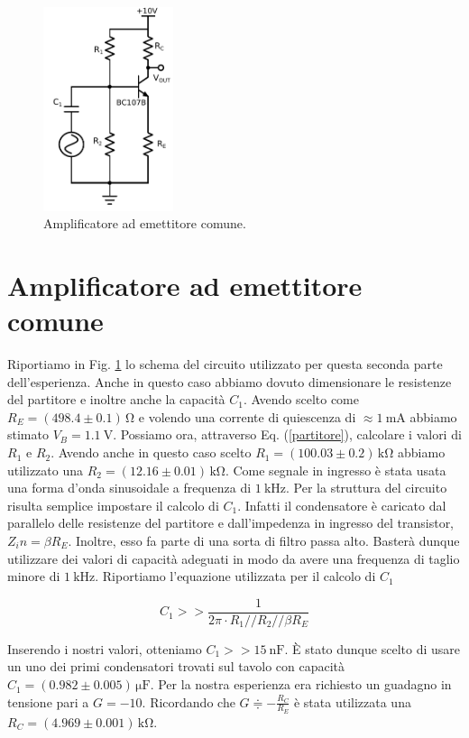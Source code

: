 \begin{figure}
	\includegraphics[width=38mm]{cc2.pdf}
	\caption{Amplificatore ad emettitore comune.}
	\label{fig:cc2}
\end{figure}

\section{Amplificatore ad emettitore comune}

Riportiamo in Fig. \ref{fig:cc2} lo schema del circuito utilizzato per questa seconda parte dell'esperienza.
Anche in questo caso abbiamo dovuto dimensionare le resistenze del partitore e inoltre anche la capacità $C_1$.
Avendo scelto come $R_E=(498.4\pm0.1)\,\si{\ohm}$ e volendo una corrente di quiescenza di $\approx \SI{1}{\milli\ampere}$ abbiamo stimato $V_B=\SI{1.1}{\volt}$.
Possiamo ora, attraverso Eq. (\ref{partitore}), calcolare i valori di $R_1$ e $R_2$.
Avendo anche in questo caso scelto $R_1=(100.03\pm0.2)\,\si{\kilo\ohm}$ abbiamo utilizzato una $R_2=(12.16\pm0.01)\,\si{\kilo\ohm}$.
Come segnale in ingresso è stata usata una forma d'onda sinusoidale a frequenza di $\SI{1}{\kilo\hertz}$.
Per la struttura del circuito risulta semplice impostare il calcolo di $C_1$.
Infatti il condensatore è caricato dal parallelo delle resistenze del partitore e dall'impedenza in ingresso del transistor, $Z_in=\beta R_E$.
Inoltre, esso fa parte di una sorta di filtro passa alto.
Basterà dunque utilizzare dei valori di capacità adeguati in modo da avere una frequenza di taglio minore di $\SI{1}{\kilo\hertz}$.
Riportiamo l'equazione utilizzata per il calcolo di $C_1$

\begin{equation}
C_1>>\frac{1}{2 \pi \cdot R_1 // R_2//\beta R_E}
\end{equation}

Inserendo i nostri valori, otteniamo $C_1>>\SI{15}{\nano\farad}$.
È stato dunque scelto di usare un uno dei primi condensatori trovati sul tavolo con capacità $C_1=(0.982\pm0.005)\,\si{\micro\farad}$.
Per la nostra esperienza era richiesto un guadagno in tensione pari a $G=-10$.
Ricordando che $G\doteqdot - \frac{R_C}{R_E}$ è stata utilizzata una $R_C=(4.969\pm0.001)\,\si{\kilo\ohm}$. 

